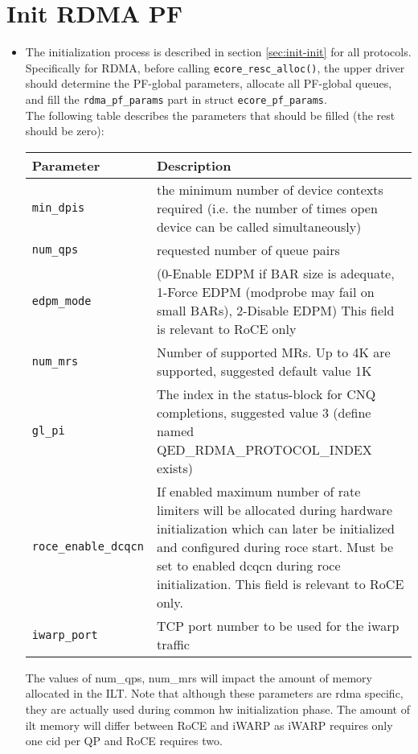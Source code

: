 \documentclass[11pt,fleqn,hidelinks,oneside]{book} %
\newcommand{\insertcode}[2]{\begin{itemize}\item[]\end{itemize}} %
\newcommand{\ChapterFuncs}{}
\newcommand{\silentfunc}[1]
{\expandafter\def\expandafter\ChapterFuncs\expandafter{\ChapterFuncs { } \insertcode{snippets/#1_generated.h}{}}}
\begin{document}
\section{Init RDMA PF}
\silentfunc{rdma_start}
\silentfunc{rdma_add_user}
\silentfunc{rdma_query_device}
\silentfunc{rdma_get_sb_id}
\begin{itemize}
\item The initialization process is described in section \ref{sec:init-init} for all protocols. \\
	Specifically for RDMA, before calling \texttt{ecore\_resc\_alloc()}, the upper driver should determine the PF-global parameters, allocate all PF-global queues, and fill the \texttt{rdma\_pf\_params} part in struct \texttt{ecore\_pf\_params}. \\
	The following table describes the parameters that should be filled (the rest should be zero):
	\begin{center}
		\begin{tabular}{| l | p{10cm} |}
		\hline
		\textbf{Parameter} & \textbf{Description} \\ \hline
		\texttt{min\_dpis} & the minimum number of device contexts required (i.e. the number of times open device can be called simultaneously) \\ \hline
		\texttt{num\_qps} & requested number of queue pairs\\ \hline
		\texttt{edpm\_mode} & (0-Enable EDPM if BAR size is adequate, 1-Force EDPM (modprobe may fail on small BARs), 2-Disable EDPM) This field is relevant to RoCE only\\ \hline
		\texttt{num\_mrs} & Number of supported MRs. Up to 4K are supported, suggested default value 1K \\ \hline
		\texttt{gl\_pi} & The index in the status-block for CNQ completions, suggested value 3 (define named QED\_RDMA\_PROTOCOL\_INDEX exists)\\ \hline
		\texttt{roce\_enable\_dcqcn} & If enabled maximum number of rate limiters will be allocated during hardware initialization which can later be initialized and configured during roce start. Must be set to enabled dcqcn during roce initialization. This field is relevant to RoCE only.\\ \hline
		\texttt{iwarp\_port} & TCP port number to be used for the iwarp traffic\\ \hline
		\end{tabular}
	\end{center}
	The values of num\_qps, num\_mrs will impact the amount of memory allocated in the ILT. Note that although these parameters are rdma specific, they are actually used during common hw initialization phase. The amount of ilt memory will differ between RoCE and iWARP as iWARP requires only one cid per QP and RoCE requires two.


\end{itemize}
\end{document}
